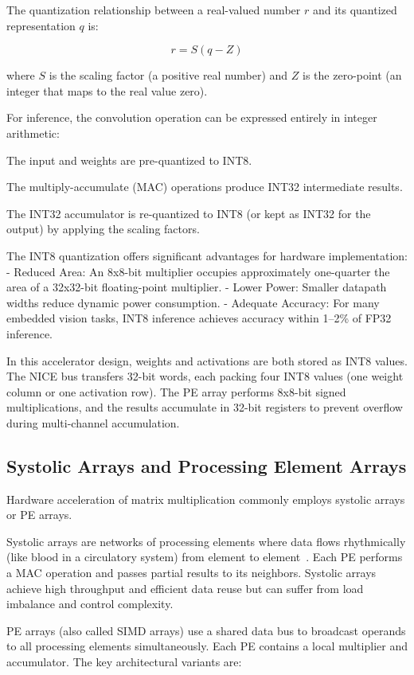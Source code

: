 The quantization relationship between a real-valued number \(r\) and its quantized representation \(q\) is:


\[ r = S (q - Z) \]


where \(S\) is the scaling factor (a positive real number) and \(Z\) is the zero-point (an integer that maps to the real value zero).


For inference, the convolution operation can be expressed entirely in integer arithmetic:


The input and weights are pre-quantized to INT8.


The multiply-accumulate (MAC) operations produce INT32 intermediate results.


The INT32 accumulator is re-quantized to INT8 (or kept as INT32 for the output) by applying the scaling factors.


The INT8 quantization offers significant advantages for hardware implementation: - Reduced Area: An 8x8-bit multiplier occupies approximately one-quarter the area of a 32x32-bit floating-point multiplier. - Lower Power: Smaller datapath widths reduce dynamic power consumption. - Adequate Accuracy: For many embedded vision tasks, INT8 inference achieves accuracy within 1–2\% of FP32 inference.


In this accelerator design, weights and activations are both stored as INT8 values. The NICE bus transfers 32-bit words, each packing four INT8 values (one weight column or one activation row). The PE array performs 8x8-bit signed multiplications, and the results accumulate in 32-bit registers to prevent overflow during multi-channel accumulation.


\subsection{Systolic Arrays and Processing Element Arrays}

Hardware acceleration of matrix multiplication commonly employs systolic arrays or PE arrays.


Systolic arrays are networks of processing elements where data flows rhythmically (like blood in a circulatory system) from element to element~\cite{KUNG_SYSTOLIC}. Each PE performs a MAC operation and passes partial results to its neighbors. Systolic arrays achieve high throughput and efficient data reuse but can suffer from load imbalance and control complexity.


PE arrays (also called SIMD arrays) use a shared data bus to broadcast operands to all processing elements simultaneously. Each PE contains a local multiplier and accumulator. The key architectural variants are:


